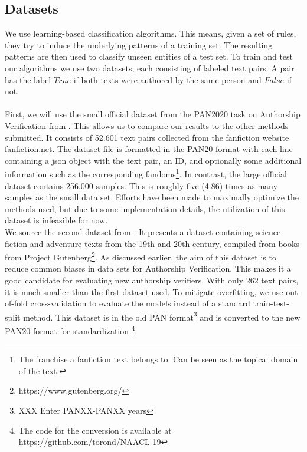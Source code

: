 \subsection{Datasets}
We use learning-based classification algorithms.
This means, given a set of rules, they try to induce the underlying patterns of a training set.
The resulting patterns are then used to classify unseen entities of a test set.
To train and test our algorithms we use two datasets, each consisting of labeled text pairs.
A pair has the label $True$ if both texts were authored by the same person and $False$ if not.\\\\
First, we will use the small official dataset from the PAN2020 task on Authorship Verification from \cite{bevendorff2020overview}.
This allows us to compare our results to the other methods submitted.
It consists of 52.601 text pairs collected from the fanfiction website \url{fanfiction.net}.
The dataset file is formatted in the PAN20 format with each line containing a json object with the text pair, an ID, and optionally some additional information such as the corresponding fandoms\footnote{The franchise a fanfiction text belongs to. Can be seen as the topical domain of the text.}.
In contrast, the large official dataset contains 256.000 samples.
This is roughly five (4.86) times as many samples as the small data set.
Efforts have been made to maximally optimize the methods used, but due to some implementation details, the utilization of this dataset is infeasible for now.\\
We source the second dataset from \cite{stein2019unbiasedGutenbergCorpus}.
It presents a dataset containing science fiction and adventure texts from the 19th and 20th century, compiled from books from Project Gutenberg\footnote{https://www.gutenberg.org/}.
As discussed earlier, the aim of this dataset is to reduce common biases in data sets for Authorship Verification.
This makes it a good candidate for evaluating new authorship verifiers.
With only 262 text pairs, it is much smaller than the first dataset used.
To mitigate overfitting, we use out-of-fold cross-validation to evaluate the models instead of a standard train-test-split method.
This dataset is in the old PAN format\footnote{XXX Enter PANXX-PANXX years} and is converted to the new PAN20 format for standardization \footnote{The code for the conversion is available at \url{https://github.com/torond/NAACL-19}}.\\

